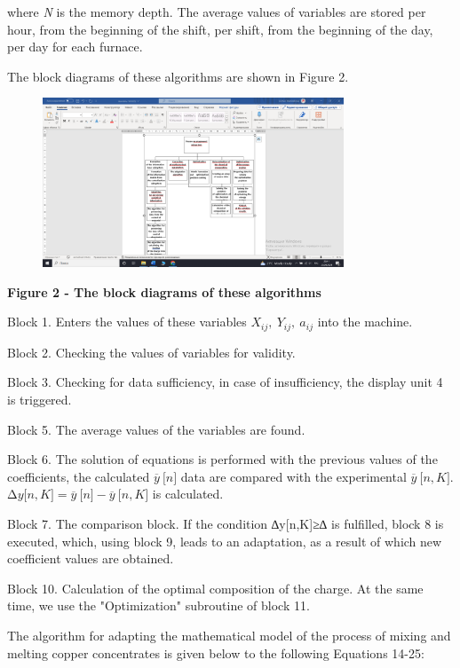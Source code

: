 where \emph{N} is the memory depth. The average values of variables are
stored per hour, from the beginning of the shift, per shift, from the
beginning of the day, per day for each furnace.

The block diagrams of these algorithms are shown in Figure 2.

\begin{figure}[H]
	\centering
	\includegraphics[width=0.8\textwidth]{assets/9}
	\caption*{}
\end{figure}

{\bfseries Figure 2 - The block diagrams of these algorithms}

Block 1. Enters the values of these variables
\(X_{ij},\ Y_{ij},\ a_{ij}\) into the machine.

Block 2. Checking the values of variables for validity.

Block 3. Checking for data sufficiency, in case of insufficiency, the
display unit 4 is triggered.

Block 5. The average values of the variables are found.

Block 6. The solution of equations is performed with the previous values
of the coefficients, the calculated \(\overline{y}\ \lbrack n\rbrack\)
data are compared with the experimental
\(\overline{y}\ \lbrack n,K\rbrack\).
\(\mathrm{\Delta}y\lbrack n,K\rbrack = \overline{y}\ \lbrack n\rbrack - \overline{y}\ \lbrack n,K\rbrack\)
is calculated.

Block 7. The comparison block. If the condition
\textbar∆y{[}n,K{]}\textbar≥∆ is fulfilled, block 8 is executed, which,
using block 9, leads to an adaptation, as a result of which new
coefficient values are obtained.

Block 10. Calculation of the optimal composition of the charge. At the
same time, we use the "Optimization" subroutine of block 11.

The algorithm for adapting the mathematical model of the process of
mixing and melting copper concentrates is given below to the following
Equations 14-25:


